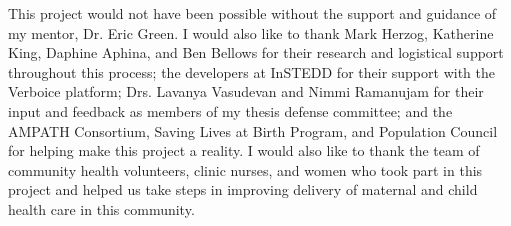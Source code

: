 \acknowledgements

This project would not have been possible without the support and guidance of my mentor, Dr. Eric Green. I would also like to thank Mark Herzog, Katherine King, Daphine Aphina, and Ben Bellows for their research and logistical support throughout this process; the developers at InSTEDD for their support with the Verboice platform; Drs. Lavanya Vasudevan and Nimmi Ramanujam for their input and feedback as members of my thesis defense committee; and the AMPATH Consortium, Saving Lives at Birth Program, and Population Council for helping make this project a reality.  I would also like to thank the team of community health volunteers, clinic nurses, and women who took part in this project and helped us take steps in improving delivery of maternal and child health care in this community. 